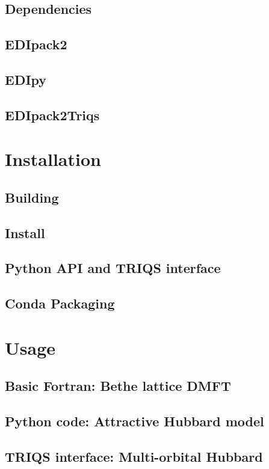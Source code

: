 \documentclass[final,3p,10pt]{elsarticle}
\begin{document}
\subsection{Dependencies}
\subsection{EDIpack2}
\subsection{EDIpy}
\subsection{EDIpack2Triqs}


\section{Installation}\label{SecInstall}
\subsection{Building}
\subsection{Install}
\subsection{Python API and TRIQS interface}
\subsection{Conda Packaging}



\section{Usage}\label{SecUsage}
\subsection{Basic Fortran: Bethe lattice DMFT}
\subsection{Python code: Attractive Hubbard model}
\subsection{TRIQS interface: Multi-orbital Hubbard}
\end{document}
